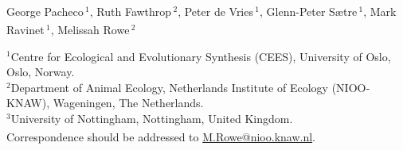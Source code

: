 

\begin{titlepage}
    \latofont %
    \color{frontpagedark} %
    \vspace*{\baselineskip} %

    \vspace{4\baselineskip}

	\noindent

    \vspace{1\baselineskip}

    \noindent

    \vspace{2\baselineskip}

\small\noindent 
George Pacheco\,$^{1}$\textsuperscript{},
Ruth Fawthrop\,$^{2}$\textsuperscript{},
Peter de Vries\,$^{1}$\textsuperscript{},
Glenn-Peter Sætre\,$^{1}$\textsuperscript{},
Mark Ravinet\,$^{1}$\textsuperscript{},
Melissah Rowe\,$^{2}$\textsuperscript{} \textsuperscript{\faEnvelope[regular]}
\myhline

\noindent\scriptsize{$^1$Centre for Ecological and Evolutionary Synthesis (CEES), University of Oslo, Oslo, Norway. \\ $^2$Department of Animal Ecology, Netherlands Institute of Ecology (NIOO‐KNAW), Wageningen, The Netherlands. \\ $^3$University of Nottingham, Nottingham, United Kingdom. \\ \textsuperscript{\faEnvelope[regular]} Correspondence should be addressed to \href{mailto:M.Rowe@nioo.knaw.nl}{M.Rowe@nioo.knaw.nl}.}




\end{titlepage}
